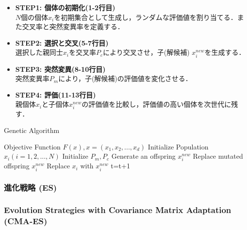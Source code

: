 \documentclass[a4j,11pt]{jarticle}
\begin{document}
\begin{itemize}
\item {\bf STEP1: 個体の初期化(1-2行目)} \\
$N$個の個体$x_i$を初期集合として生成し，ランダムな評価値を割り当てる．また交叉率と突然変異率を定義する．
\item {\bf STEP2: 選択と交叉(5-7行目)} \\
選択した親同士$x_i$を交叉率$P_c$により交叉させ，子(解候補) $x_i^{new}$を生成する．
\item {\bf STEP3: 突然変異(8-10行目)} \\
突然変異率$P_m$により，子(解候補)の評価値を変化させる．
\item {\bf STEP4: 評価(11-13行目)} \\
親個体$x_i$と子個体$x_i^{new}$の評価値を比較し，評価値の高い個体を次世代に残す．
\end{itemize}

\renewcommand{\algorithmicrequire}{\textbf{Input:}}
\renewcommand{\algorithmicensure}{\textbf{Output:}}

\begin{algorithm}[H]
\caption{Genetic Algorithm}
\label{code:ga}
\begin{algorithmic}[1]
\REQUIRE Objective Function $F(x), x=(x_1,x_2,...,x_d)$
\STATE Initialize Population $x_i (i=1,2,...,N)$
\STATE Initialize $P_m, P_c$
\STATE Generate an offspring $x_i^{new}$ 
\ENDIF
{}
\STATE Replace mutated offspring $x_i^{new}$
\ENDIF
{}
\STATE Replace $x_i$ with $x_i^{new}$
\ENDIF
\ENDFOR
\STATE t=t+1
\ENDWHILE
\end{algorithmic}
\end{algorithm}

\subsubsection{進化戦略 (ES)}
\label{sss:ES}

\subsubsection{Evolution Strategies with Covariance Matrix Adaptation (CMA-ES)}
\label{sss:cma-es}
\end{document}
